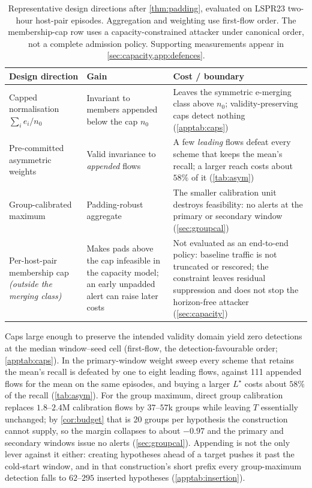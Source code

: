 \documentclass[conference]{IEEEtran}
\begin{document}
\begin{table}[t]
\centering
\caption{Representative design directions after \cref{thm:padding}, evaluated on LSPR23 two-hour
host-pair episodes. Aggregation and weighting use first-flow order. The membership-cap row uses a
capacity-constrained attacker under canonical order, not a complete admission policy. Supporting
measurements appear in \cref{sec:capacity,app:defences}.}
\label{tab:defenses}
\footnotesize
\setlength{\tabcolsep}{6pt}
\begin{tabular}{@{}>{\raggedright\arraybackslash}p{4.0cm}>{\raggedright\arraybackslash}p{5.4cm}>{\raggedright\arraybackslash}p{7.2cm}@{}}
\toprule
Design direction & Gain & Cost / boundary \\
\midrule
Capped normalisation $\sum_ie_i/n_0$ & Invariant to members appended below the cap $n_0$ &
Leaves the symmetric e-merging class above $n_0$; validity-preserving caps detect nothing
(\cref{apptab:caps}) \\[2pt]
Pre-committed asymmetric weights~\cite{wang2025admissible} & Valid invariance to \emph{appended} flows &
A few \emph{leading} flows defeat every scheme that keeps the mean's recall; a larger reach costs about
$58\%$ of it (\cref{tab:asym}) \\[2pt]
Group-calibrated maximum & Padding-robust aggregate & The smaller calibration unit destroys
feasibility: no alerts at the primary or secondary window (\cref{sec:groupcal}) \\[2pt]
Per-host-pair membership cap \emph{(outside the merging class)} & Makes pads above the cap infeasible
in the capacity model; an early unpadded alert can raise later costs & Not evaluated as an end-to-end
policy: baseline traffic is not truncated or rescored; the constraint leaves residual suppression and
does not stop the horizon-free attacker (\cref{sec:capacity}) \\
\bottomrule
\end{tabular}
\end{table}

Caps large enough to preserve the intended validity domain yield zero detections at the median
window--seed cell (first-flow, the detection-favourable order; \cref{apptab:caps}). In the
primary-window weight sweep every scheme that retains the mean's recall is defeated by one to eight
leading flows, against 111 appended flows for the mean on the same episodes, and buying a larger
$L^{\star}$ costs about $58\%$ of the recall (\cref{tab:asym}). For the group maximum, direct group
calibration replaces $1.8$--$2.4$M calibration flows by $37$--$57$k groups while leaving $T$ essentially
unchanged; by \cref{cor:budget} that is 20 groups per hypothesis the construction cannot supply, so the
margin collapses to about $-0.97$ and the primary and secondary windows issue no alerts
(\cref{sec:groupcal}). Appending is not the only lever against it either: creating hypotheses ahead of a
target pushes it past the cold-start window, and in that construction's short prefix every
group-maximum detection falls to $62$--$295$ inserted hypotheses (\cref{apptab:insertion}).
\end{document}
